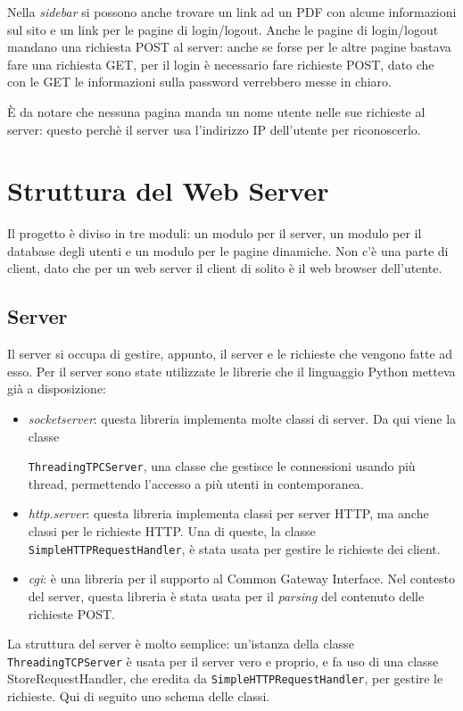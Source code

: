 \documentclass[a4paper,12pt]{report}
\begin{document}
Nella \textit{sidebar} si possono anche trovare un link ad un PDF con alcune informazioni sul sito e un link per le pagine di login/logout. Anche le pagine di login/logout mandano una richiesta POST al server: anche se forse per le altre pagine bastava fare una richiesta GET, per il login è necessario fare richieste POST, dato che con le GET le informazioni sulla password verrebbero messe in chiaro.

È da notare che nessuna pagina manda un nome utente nelle sue richieste al server: questo perchè il server usa l'indirizzo IP dell'utente per riconoscerlo.

\chapter{Struttura del Web Server}

Il progetto è diviso in tre moduli: un modulo per il server, un modulo per il database degli utenti e un modulo per le pagine dinamiche. Non c'è una parte di client, dato che per un web server il client di solito è il web browser dell'utente.

\section{Server}

Il server si occupa di gestire, appunto, il server e le richieste che vengono fatte ad esso. Per il server sono state utilizzate le librerie che il linguaggio Python metteva già a disposizione:
\begin{itemize}
\item \textit{socketserver}: questa libreria implementa molte classi di server. Da qui viene la classe

\texttt{ThreadingTPCServer}, una classe che gestisce le connessioni usando più thread, permettendo l'accesso a più utenti in contemporanea.
\item \textit{http.server}: questa libreria implementa classi per server HTTP, ma anche classi per le richieste HTTP. Una di queste, la classe \texttt{SimpleHTTPRequestHandler}, è stata usata per gestire le richieste dei client.
\item \textit{cgi}: è una libreria per il supporto al Common Gateway Interface. Nel contesto del server, questa libreria è stata usata per il \textit{parsing} del contenuto delle richieste POST.
\end{itemize}

La struttura del server è molto semplice: un'istanza della classe \texttt{ThreadingTCPServer} è usata per il server vero e proprio, e fa uso di una classe StoreRequestHandler, che eredita da \texttt{SimpleHTTPRequestHandler}, per gestire le richieste. Qui di seguito uno schema delle classi.
\end{document}
